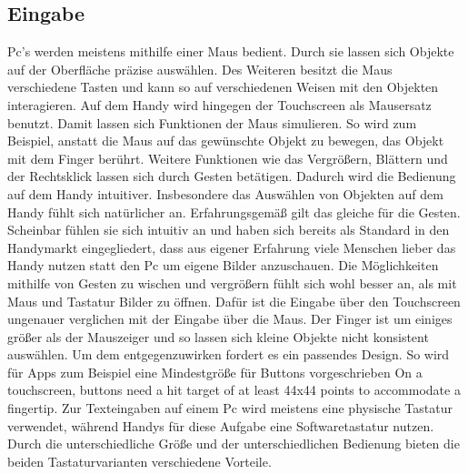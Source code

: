 \subsection{Eingabe} \myCheckmark
Pc's werden meistens mithilfe einer Maus bedient. Durch sie lassen sich Objekte auf der Oberfläche präzise auswählen. Des Weiteren besitzt die Maus verschiedene Tasten und kann so auf verschiedenen Weisen mit den Objekten interagieren.\newline%
Auf dem Handy wird hingegen der Touchscreen als Mausersatz benutzt. Damit lassen sich Funktionen der Maus simulieren. So wird zum Beispiel, anstatt die Maus auf das gewünschte Objekt zu bewegen, das Objekt mit dem Finger berührt. Weitere Funktionen wie das Vergrößern, Blättern und der Rechtsklick lassen sich durch Gesten betätigen.\newline%
	Dadurch wird die Bedienung auf dem Handy intuitiver. %
		 Insbesondere das Auswählen von Objekten auf dem Handy fühlt sich natürlicher an.\newline%
		Erfahrungsgemäß gilt das gleiche für die Gesten. Scheinbar fühlen sie sich intuitiv an und haben sich bereits als Standard in den Handymarkt eingegliedert, dass aus eigener Erfahrung viele Menschen lieber das Handy nutzen statt den Pc um eigene Bilder anzuschauen. Die Möglichkeiten mithilfe von Gesten zu wischen und vergrößern fühlt sich wohl besser an, als mit Maus und Tastatur Bilder zu öffnen.\newline%
	Dafür ist die Eingabe über den Touchscreen ungenauer verglichen mit der Eingabe über die Maus. Der Finger ist um einiges größer als der Mauszeiger und so lassen sich kleine Objekte nicht konsistent auswählen. Um dem entgegenzuwirken fordert es ein passendes Design. So wird für Apps zum Beispiel eine Mindestgröße für Buttons vorgeschrieben \glqq On a touchscreen, buttons need a hit target of at least 44x44 points to accommodate a fingertip\grqq{}\cite{konventionen_buttonSize}.%
\myNewSection%
Zur Texteingaben auf einem Pc wird meistens eine physische Tastatur verwendet, während Handys für diese Aufgabe eine Softwaretastatur nutzen. Durch die unterschiedliche Größe und der unterschiedlichen Bedienung bieten die beiden Tastaturvarianten verschiedene Vorteile.\newline%
